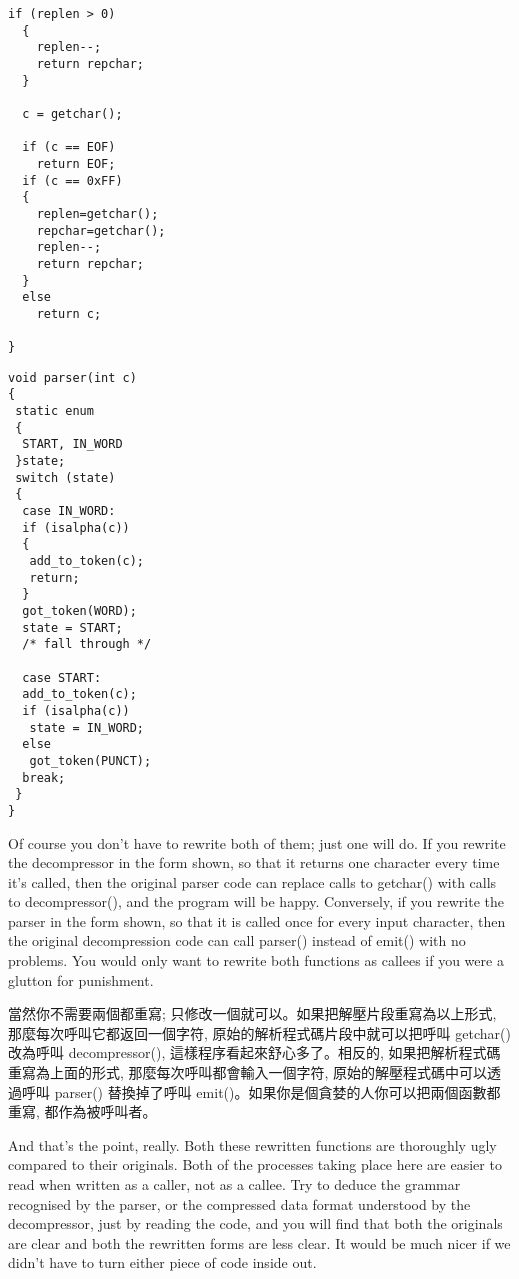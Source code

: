 \documentclass[12pt]{article}
\begin{document}
\begin{CJK}{UTF8}{bsmi}
\begin{multicols}{2}
\begin{lstlisting}[caption=decompression, basicstyle=\footnotesize]
  if (replen > 0) 
  {
    replen--;
    return repchar;
  }

  c = getchar();

  if (c == EOF)
    return EOF;
  if (c == 0xFF) 
  {
    replen=getchar();
    repchar=getchar();
    replen--;
    return repchar;
  }
  else
    return c;

}
\end{lstlisting}

\begin{lstlisting}[caption=parsesr, basicstyle=\footnotesize, breaklines=true]
void parser(int c) 
{
 static enum 
 {
  START, IN_WORD
 }state;
 switch (state) 
 {
  case IN_WORD:
  if (isalpha(c)) 
  {
   add_to_token(c);
   return;
  }
  got_token(WORD);
  state = START;
  /* fall through */

  case START:
  add_to_token(c);
  if (isalpha(c))
   state = IN_WORD;
  else
   got_token(PUNCT);
  break;
 }
}
\end{lstlisting}
\end{multicols}

 Of course you don't have to rewrite both of them; just one will do. If you rewrite the decompressor in the form shown, so that it returns one character every time it's called, then the original parser code can replace calls to getchar() with calls to decompressor(), and the program will be happy. Conversely, if you rewrite the parser in the form shown, so that it is called once for every input character, then the original decompression code can call parser() instead of emit() with no problems. You would only want to rewrite both functions as callees if you were a glutton for punishment.

當然你不需要兩個都重寫; 只修改一個就可以。如果把解壓片段重寫為以上形式, 那麼每次呼叫它都返回一個字符, 原始的解析程式碼片段中就可以把呼叫 getchar() 改為呼叫 decompressor(), 這樣程序看起來舒心多了。相反的, 如果把解析程式碼重寫為上面的形式, 那麼每次呼叫都會輸入一個字符, 原始的解壓程式碼中可以透過呼叫 parser() 替換掉了呼叫 emit()。如果你是個貪婪的人你可以把兩個函數都重寫, 都作為被呼叫者。

And that's the point, really. Both these rewritten functions are thoroughly ugly compared to their originals. Both of the processes taking place here are easier to read when written as a caller, not as a callee. Try to deduce the grammar recognised by the parser, or the compressed data format understood by the decompressor, just by reading the code, and you will find that both the originals are clear and both the rewritten forms are less clear. It would be much nicer if we didn't have to turn either piece of code inside out.


\end{CJK}
\end{document}

